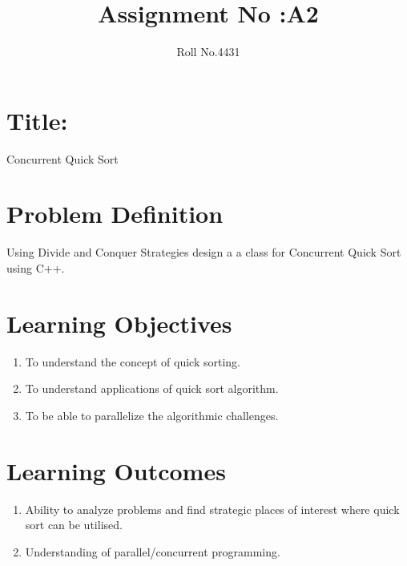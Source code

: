 \documentclass[10pt,a4paper]{article}
\title{Assignment No :A2}
\date{}
\author{Roll No.4431}
\begin{document}
\maketitle
\section{Title:}
Concurrent Quick Sort

\section{Problem Definition}
Using Divide and Conquer Strategies design a a class for Concurrent Quick Sort using C++.

\section{Learning Objectives}
\begin{enumerate}
\item To understand the concept of quick sorting.
\item To understand applications of quick sort algorithm.
\item To be able to parallelize the algorithmic challenges.
\end{enumerate}

\section{Learning Outcomes}
\begin{enumerate}
\item Ability to analyze problems and find strategic places of interest where quick sort can be utilised.
\item Understanding of parallel/concurrent programming.
\end{enumerate}
\end{document}
